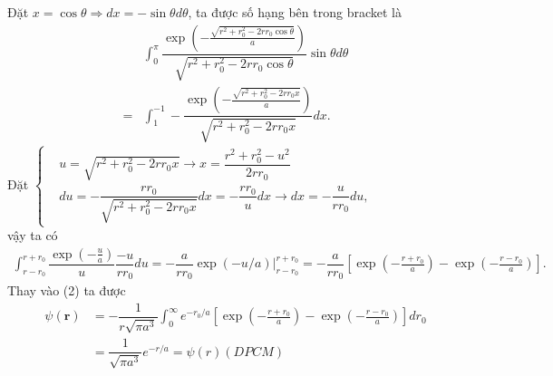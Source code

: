 \documentclass{report}
\newcommand{\f}[2]{\dfrac{#1}{#2}}
\newcommand{\at}[2]{\bigg\rvert_{#1}^{#2} }
\begin{document}
Đặt $x = \cos\theta \Rightarrow dx = -\sin\theta d\theta$, ta được số hạng bên trong bracket là
\begin{align*}
	  & \int_{0}^{\pi}  \f{\exp\left(-\frac{\sqrt{r^2 + r_0^2 - 2rr_0\cos\theta}}{a}\right)}{\sqrt{r^2 + r_0^2 - 2rr_0\cos\theta}} \sin\theta  d\theta \\
	= & \int_{1}^{-1} -\f{\exp \left( -\frac{\sqrt{r^2 + r_0^2 - 2rr_0 x}}{a} \right) }{\sqrt{r^2 + r_0^2 - 2rr_0 x}} dx.
\end{align*}
Đặt
$
	\begin{cases}
		 & u = \sqrt{r^2 + r_0^2 - 2rr_0 x} \rightarrow x = \f{r^2 + r_0^2 - u^2}{2r r_0}                      \\
		 & du = -\f{rr_0}{\sqrt{r^2 + r_0^2 - 2rr_0 x}} dx = -\f{rr_0}{u} dx \rightarrow dx = -\f{u}{rr_0} du,
	\end{cases}
$\\
vậy ta có
\begin{align*}
	\int_{r-r_0}^{r+r_0}\f{\exp(-\frac{u}{a})}{u} \f{-u}{rr_0} du = -\f{a}{r r_0} \exp(-u/a)\at{r-r_0}{r+r_0} = -\f{a}{r r_0} \left[ \exp(-\frac{r+r_0}{a}) - \exp(-\frac{r-r_0}{a}) \right].
\end{align*}
Thay vào (2) ta được
\begin{align*}
	\psi(\mathbf{r})
	 & = -\f{1}{r\sqrt{\pi a^3}} \int_{0}^{\infty} e^{-r_0/a} \left[ \exp(-\frac{r+r_0}{a}) - \exp(-\frac{r-r_0}{a}) \right] dr_0 \\
	 & =  \f{1}{\sqrt{\pi a^3}} e^{-r/a} = \psi(r) (DPCM)
\end{align*}
\end{document}
